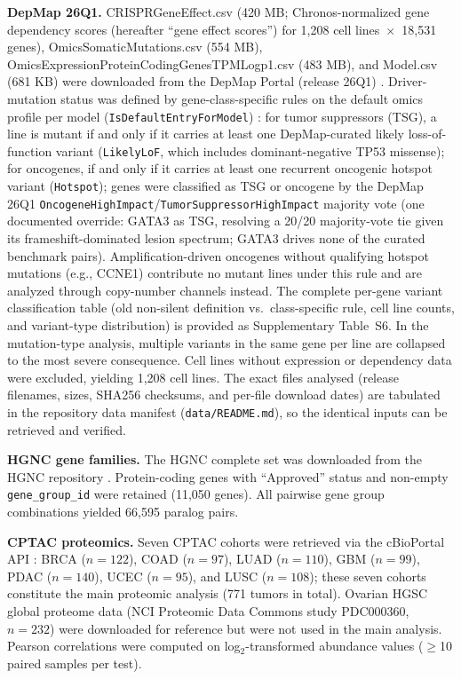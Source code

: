 \documentclass[11pt,a4paper]{article}
\begin{document}
\textbf{DepMap 26Q1.} CRISPRGeneEffect.csv (420 MB; Chronos-normalized gene dependency scores (hereafter ``gene effect scores'') for 1,208 cell lines~$\times$~18,531 genes), OmicsSomaticMutations.csv (554 MB), OmicsExpressionProteinCodingGenesTPMLogp1.csv (483 MB), and Model.csv (681 KB) were downloaded from the DepMap Portal (release 26Q1) \cite{DepMap2026,Meyers2017}. Driver-mutation status was defined by gene-class-specific rules on the default omics profile per model (\texttt{IsDefaultEntryForModel}) \cite{Dempster2021}: for tumor suppressors (TSG), a line is mutant if and only if it carries at least one DepMap-curated likely loss-of-function variant (\texttt{LikelyLoF}, which includes dominant-negative TP53 missense); for oncogenes, if and only if it carries at least one recurrent oncogenic hotspot variant (\texttt{Hotspot}); genes were classified as TSG or oncogene by the DepMap 26Q1 \texttt{OncogeneHighImpact}/\texttt{TumorSuppressorHighImpact} majority vote (one documented override: GATA3 as TSG, resolving a 20/20 majority-vote tie given its frameshift-dominated lesion spectrum; GATA3 drives none of the curated benchmark pairs). Amplification-driven oncogenes without qualifying hotspot mutations (e.g., CCNE1) contribute no mutant lines under this rule and are analyzed through copy-number channels instead. The complete per-gene variant classification table (old non-silent definition vs.\ class-specific rule, cell line counts, and variant-type distribution) is provided as Supplementary Table~S6. In the mutation-type analysis, multiple variants in the same gene per line are collapsed to the most severe consequence. Cell lines without expression or dependency data were excluded, yielding 1,208 cell lines. The exact files analysed (release filenames, sizes, SHA256 checksums, and per-file download dates) are tabulated in the repository data manifest (\texttt{data/README.md}), so the identical inputs can be retrieved and verified.

\textbf{HGNC gene families.} The HGNC complete set was downloaded from the HGNC repository \cite{HGNC}. Protein-coding genes with ``Approved'' status and non-empty \texttt{gene\_group\_id} were retained (11,050 genes). All pairwise gene group combinations yielded 66,595 paralog pairs.

\textbf{CPTAC proteomics.} Seven CPTAC cohorts were retrieved via the cBioPortal API \cite{Cerami2012,Gao2013}: BRCA ($n=122$), COAD ($n=97$), LUAD ($n=110$), GBM ($n=99$), PDAC ($n=140$), UCEC ($n=95$), and LUSC ($n=108$); these seven cohorts constitute the main proteomic analysis (771 tumors in total). Ovarian HGSC global proteome data (NCI Proteomic Data Commons study PDC000360, $n=232$) \cite{Edwards2015} were downloaded for reference but were not used in the main analysis. Pearson correlations were computed on log$_2$-transformed abundance values ($\ge$10 paired samples per test).
\end{document}
